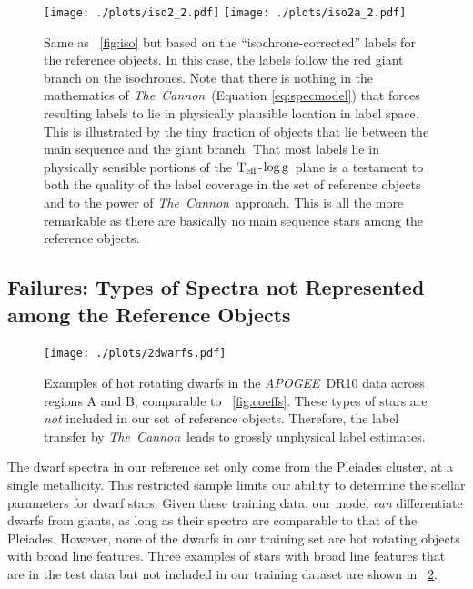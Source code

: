 \documentclass[12pt, preprint]{aastex}
\newcommand{\tc}{\textsl{The~Cannon}}
\newcommand{\apogee}{\textsl{APOGEE}}
\newcommand{\teff}{\mbox{$\rm T_{eff}$}}
\newcommand{\logg}{\mbox{$\rm \log g$}}
\begin{document}
\begin{figure}[!h]
\centering
 \texttt{[image: ./plots/iso2\_2.pdf]}
  \hspace{-20pt}
    \texttt{[image: ./plots/iso2a\_2.pdf]}
\caption{Same as \figurename~\ref{fig:iso} but based on the ``isochrone-corrected'' labels for the reference objects. In this case, the labels follow the red giant branch on the isochrones. Note that there is nothing in the mathematics of \tc\ (Equation \ref{eq:specmodel}) that forces resulting labels to lie in physically plausible location in label space. This is illustrated by the tiny fraction of objects that lie between the main sequence and the giant branch. That most labels lie in physically sensible portions of the \teff-\logg\ plane is a testament to both the quality of the label coverage in the set of reference objects and to the power of \tc\ approach. This is all the more remarkable as there are basically no main sequence stars among the reference objects.}
\label{fig:iso2}
\end{figure}


\subsection{Failures: Types of Spectra not Represented among the Reference Objects}
\label{sec:AnomalousSpectra}

\begin{figure}[!h]
\centering
\texttt{[image: ./plots/2dwarfs.pdf]}
\caption{Examples of hot rotating dwarfs in the \apogee\ DR10 data across regions A and B, comparable to \figurename~\ref{fig:coeffs}. These types of stars are \textit{not} included in our set of reference objects. Therefore, the label transfer by \tc\ leads to grossly unphysical label estimates.}
\label{fig:dwarfs}
\end{figure}


The dwarf spectra in our reference set only come from the Pleiades cluster, at a single metallicity. 
This restricted sample limits our ability to determine the stellar parameters for dwarf stars. 
Given these training data, our model \textit{can} differentiate dwarfs from giants, as long as their spectra are comparable to that of the Pleiades. 
However, none of the dwarfs in our training set are hot rotating objects with broad line features. 
Three examples of stars with broad line features that are in the test data but not included in our training dataset are shown in \figurename~\ref{fig:dwarfs}.
\end{document}
